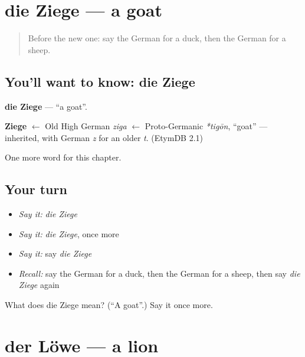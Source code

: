 \section[die Ziege]{die Ziege — a goat}

\label{lesson:GE-C87-ziege}



\begin{quote}
Before the new one: say the German for a duck, then the German for a sheep.
\end{quote}

\subsection*{You'll want to know: die Ziege}
\textbf{die Ziege} — \textquotedblleft{}a goat\textquotedblright{}.

\begin{cousinweb}
\textbf{Ziege} $\leftarrow$ Old High German \emph{ziga} $\leftarrow$ Proto-Germanic \emph{*tigōn}, \textquotedblleft{}goat\textquotedblright{} — inherited, with German \emph{z} for an older \emph{t}. (EtymDB 2.1)
\end{cousinweb}

\begin{grammarlens}[title={What you've built}]
One more word for this chapter.
\end{grammarlens}

\subsection*{Your turn}
\begin{itemize}
\raggedright
  \item \emph{Say it:} \emph{die Ziege}
  \item \emph{Say it:} \emph{die Ziege}, once more
  \item \emph{Say it:} say \emph{die Ziege}
  \item \emph{Recall:} say the German for a duck, then the German for a sheep, then say \emph{die Ziege} again
\end{itemize}

\begin{tcolorbox}[breakable,colback=teal!4,colframe=teal!35!black,title={Before you move on}]
What does die Ziege mean? (\textquotedblleft{}A goat\textquotedblright{}.) Say it once more.
\end{tcolorbox}
\section[der Löwe]{der Löwe — a lion}

